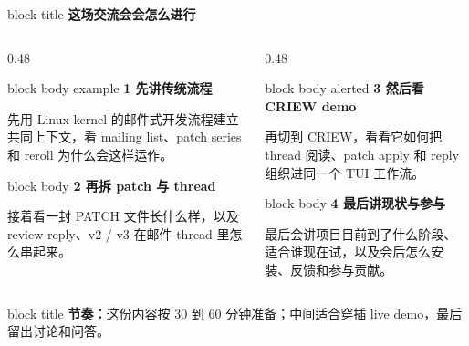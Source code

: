 \documentclass[aspectratio=169,professionalfonts]{beamer}
\newcommand{\sectiontitle}[1]{
  \begin{beamercolorbox}[wd=\linewidth,sep=0.7em,rounded=true]{block title}
    \usebeamerfont*{frametitle}\Large\bfseries #1
  \end{beamercolorbox}
  \vspace{0.4em}
}
\newcommand{\statcard}[3]{
  \begin{beamercolorbox}[wd=\linewidth,sep=0.8em,rounded=true]{#1}
    {\bfseries #2}\par
    \vspace{0.3em}
    #3
  \end{beamercolorbox}
}
\begin{document}
\begin{frame}
  \sectiontitle{这场交流会会怎么进行}
  \scriptsize
  \begin{columns}[T,totalwidth=\textwidth]
    \begin{column}{0.48\textwidth}
      \statcard{block body example}{1 先讲传统流程}{
        先用 Linux kernel 的邮件式开发流程建立共同上下文，看 mailing list、patch series 和 reroll 为什么会这样运作。
      }
      \vspace{0.35em}
      \statcard{block body}{2 再拆 patch 与 thread}{
        接着看一封 PATCH 文件长什么样，以及 review reply、v2 / v3 在邮件 thread 里怎么串起来。
      }
    \end{column}
    \begin{column}{0.48\textwidth}
      \statcard{block body alerted}{3 然后看 CRIEW demo}{
        再切到 CRIEW，看看它如何把 thread 阅读、patch apply 和 reply 组织进同一个 TUI 工作流。
      }
      \vspace{0.35em}
      \statcard{block body}{4 最后讲现状与参与}{
        最后会讲项目目前到了什么阶段、适合谁现在试，以及会后怎么安装、反馈和参与贡献。
      }
    \end{column}
  \end{columns}
  \vspace{0.35em}
  \begin{beamercolorbox}[wd=\linewidth,sep=0.65em,rounded=true]{block title}
    \textbf{节奏：}这份内容按 30 到 60 分钟准备；中间适合穿插 live demo，最后留出讨论和问答。
  \end{beamercolorbox}
\end{frame}
\end{document}
